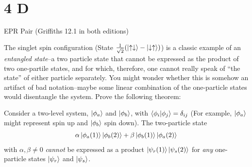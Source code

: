 \documentclass{article}
\begin{document}
\section*{4 D}
\begin{ques}\label{q4}
EPR Pair (Griffiths 12.1 in both editions)

\hfil

The singlet spin configuration (State $\frac{1}{\sqrt{2}}(\ket{\uparrow\downarrow}-\ket{\downarrow\uparrow})$) is a classic example of an \emph{entangled state}--a two particle state that cannot be expressed as the product of two one-partile states, and for which, therefore, one cannot really speak of ``the state'' of either particle separately. You might wonder whether this is somehow an artifact of bad notation--maybe some linear combination of the one-particle states would disentangle the system. Prove the following theorem:
\begin{thm}
    Consider a two-level system, $\ket{\phi_a}$ and $\ket{\phi_b}$, with $\braket{\phi_i}{\phi_j}=\delta_{ij}$ (For example, $\ket{\phi_a}$ might represent spin up and $\ket{\phi_b}$ spin down). The two-particle state 
    $$\alpha\ket{\phi_a(1)}\ket{\phi_b(2)}+\beta\ket{\phi_b(1)}\ket{\phi_a(2)}$$
    with $\alpha,\beta\neq 0$ \emph{cannot} be expressed as a product $\ket{\psi_r(1)}\ket{\psi_s(2)}$ for \emph{any} one-particle states $\ket{\psi_r}$ and $\ket{\psi_s}$.
\end{thm}
\end{ques}
\end{document}
